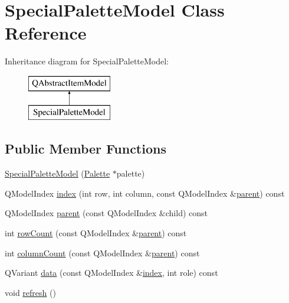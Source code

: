 \hypertarget{class_special_palette_model}{}\section{Special\+Palette\+Model Class Reference}
\label{class_special_palette_model}
Inheritance diagram for Special\+Palette\+Model\+:\begin{figure}[H]
\begin{center}
\leavevmode
\includegraphics[height=2.000000cm]{df/d00/class_special_palette_model}
\end{center}
\end{figure}
\subsection*{Public Member Functions}
\begin{DoxyCompactItemize}
\item 
\mbox{\hyperlink{class_special_palette_model_af756e3cee09de754ec45e43263d960b3}{Special\+Palette\+Model}} (\mbox{\hyperlink{class_palette}{Palette}} $\ast$palette)
\item 
Q\+Model\+Index \mbox{\hyperlink{class_special_palette_model_a94fc1673a8a051df110aa0a60414269a}{index}} (int row, int column, const Q\+Model\+Index \&\mbox{\hyperlink{class_special_palette_model_ac2f39fe05f07467200958bb107464273}{parent}}) const
\item 
Q\+Model\+Index \mbox{\hyperlink{class_special_palette_model_ac2f39fe05f07467200958bb107464273}{parent}} (const Q\+Model\+Index \&child) const
\item 
int \mbox{\hyperlink{class_special_palette_model_a6422b3c182e1c0f50b6c0dd33d702d5e}{row\+Count}} (const Q\+Model\+Index \&\mbox{\hyperlink{class_special_palette_model_ac2f39fe05f07467200958bb107464273}{parent}}) const
\item 
int \mbox{\hyperlink{class_special_palette_model_af77fffd5f30512f6ee210988618db9b4}{column\+Count}} (const Q\+Model\+Index \&\mbox{\hyperlink{class_special_palette_model_ac2f39fe05f07467200958bb107464273}{parent}}) const
\item 
Q\+Variant \mbox{\hyperlink{class_special_palette_model_aa879e615661b3fa247fc749535854527}{data}} (const Q\+Model\+Index \&\mbox{\hyperlink{class_special_palette_model_a94fc1673a8a051df110aa0a60414269a}{index}}, int role) const
\item 
void \mbox{\hyperlink{class_special_palette_model_af10e3bdd46f5a73218cdecf54a27f714}{refresh}} ()
\end{DoxyCompactItemize}


